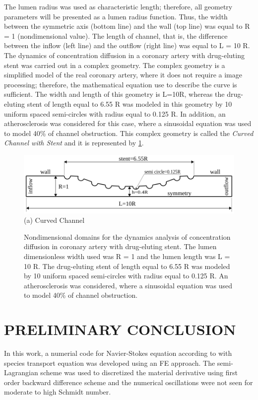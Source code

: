 \documentclass[10pt,fleqn,a4paper,twoside]{article}
\begin{document}
\smallskip
{The lumen radius was used as characteristic
length; therefore,
all geometry parameters will be presented
as a lumen radius function.
Thus, the width
between the symmetric axis (bottom line)
and the wall (top line) was equal to R = 1 (nondimensional value).
The length of channel, that is, the difference between the
inflow (left line) and the outflow (right line) was
equal to L = 10 R.}
The dynamics of concentration diffusion in 
a coronary artery with drug-eluting stent
was carried out in a complex geometry.
The complex geometry is a simplified model 
of the real coronary artery, where it does not require a image 
processing; therefore, the
mathematical equation use to describe the curve is sufficient. 
The width and length of this
geometry is L=10R, whereas the drug-eluting stent of length equal to
6.55 R was modeled in this geometry by 10 uniform 
spaced semi-circles with radius equal
to 0.125 R. In addition, an atherosclerosis was 
considered for this case, where a sinusoidal equation
was used to model 40\% of channel obstruction.
This complex geometry is called the 
\textit{Curved Channel with Stent} and it is represented
by \ref{geometry}. 




\begin{figure}[H]
     \begin{center}
      \includegraphics[scale=0.6]{./figure/CurvedStrut.png}\\
     (a) Curved Channel
     \end{center}
     \label{geometry}
     \caption{
Nondimensional domains for the dynamics analysis of 
concentration diffusion in coronary artery with drug-eluting stent. 
The lumen dimensionless width used was R = 1 and 
the lumen length was L = 10 R. The
drug-eluting stent of length equal to 6.55 R was modeled 
by 10 uniform spaced semi-circles with radius
equal to 0.125 R. An atherosclerosis was considered, 
where a sinusoidal equation was used to model 40\% of
channel obstruction.
}
\end{figure}



\section{PRELIMINARY CONCLUSION}
In this work, a numerial code for Navier-Stokes equation according to 
with species
transport equation was developed using an FE approach.
The semi-Lagrangian scheme was used to discretized the material derivative
using first order backward difference scheme and the numerical oscillations
were not seen for moderate to high Schmidt number.
\end{document}
